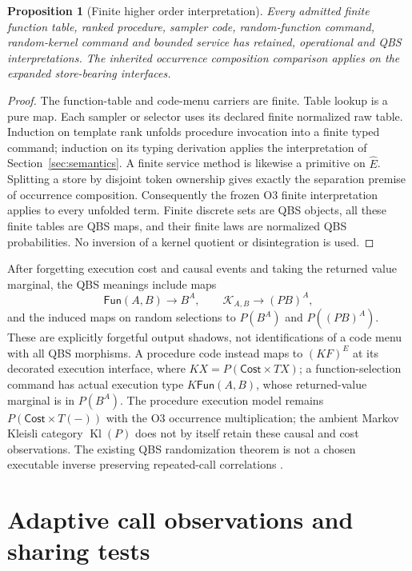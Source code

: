 \documentclass[11pt,a4paper]{article}
\newtheorem{proposition}[theorem]{Proposition}
\theoremstyle{definition}
\newcommand{\Cost}{\mathsf{Cost}}
\newcommand{\Fun}{\mathsf{Fun}}
\begin{document}
\begin{proposition}[Finite higher order interpretation]\label{prop:higher-models}
Every admitted finite function table, ranked procedure, sampler code,
random-function command, random-kernel command and bounded service has
retained, operational and QBS interpretations. The inherited occurrence
composition comparison applies on the expanded store-bearing interfaces.
\end{proposition}
\begin{proof}
The function-table and code-menu carriers are finite. Table lookup is a
pure map. Each sampler or selector uses its declared finite normalized raw
table. Induction on template rank unfolds procedure invocation into a
finite typed command; induction on its typing derivation applies the
interpretation of Section~\ref{sec:semantics}. A finite service method is
likewise a primitive on $\widehat E$. Splitting a store by disjoint token
ownership gives exactly the separation premise of occurrence composition.
Consequently the frozen O3 finite interpretation applies to every unfolded
term. Finite discrete sets are QBS objects, all these finite tables are QBS
maps, and their finite laws are normalized QBS probabilities. No inversion
of a kernel quotient or disintegration is used.
\end{proof}
After forgetting execution cost and causal events and taking the returned
value marginal, the QBS meanings include maps
\[
 \Fun(A,B)\longrightarrow B^A,
 \qquad \mathcal K_{A,B}\longrightarrow(PB)^A,
\]
and the induced maps on random selections to $P(B^A)$ and $P((PB)^A)$.
These are explicitly forgetful output shadows, not identifications of a
code menu with all QBS morphisms. A procedure code instead maps to
$(K F)^E$ at its decorated execution interface, where
$KX=P(\Cost\times TX)$; a function-selection command has actual
execution type $K\Fun(A,B)$, whose returned-value marginal is in
$P(B^A)$. The procedure execution model remains
$P(\Cost\times T(-))$ with the O3 occurrence multiplication; the ambient
Markov Kleisli category $\operatorname{Kl}(P)$ does not by itself retain
these causal and cost observations. The existing QBS randomization theorem
is not a chosen executable inverse preserving repeated-call correlations
\cite{QBS2017}.

\section{Adaptive call observations and sharing tests}\label{sec:call}
\end{document}
